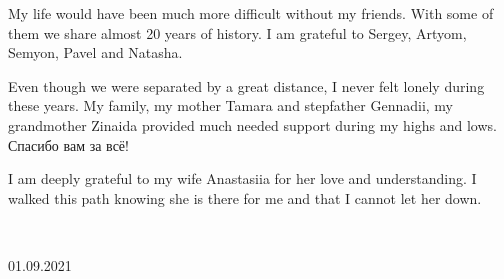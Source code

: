 My life would have been much more difficult without my friends.
With some of them we share almost 20 years of history.
I am grateful to Sergey, Artyom, Semyon, Pavel and Natasha.

Even though we were separated by a great distance, I never felt lonely during these years.
My family, my mother Tamara and stepfather Gennadii, my grandmother Zinaida provided much needed support during my highs and lows. 
\selectfont
Спасибо вам за всё!
\selectfont

I am deeply grateful to my wife Anastasiia for her love and understanding.
I walked this path knowing she is there for me and that I cannot let her down.

\mbox{}\\[2\baselineskip]
\begin{flushright}
01.09.2021 \\
\textit{\Author}
\end{flushright}
%
%
\mbox{}\newpage


\iffin
\def\contentsname{Sisällys}
\else
\def\contentsname{Table of Contents}
\fi
\tableofcontents

% 
%
{
\iffin
\printnoidxglossary[
    style=alttree,
    title=Lyhenteet,
    toctitle=Lyhenteet, 
    sort=word, 
    type=\acronymtype
]
\else
\printnoidxglossary[
    style=alttree,
    title=Abbreviations,
    toctitle=Abbreviations, 
    sort=word, 
    type=\acronymtype
]
\fi
}
\iffin
